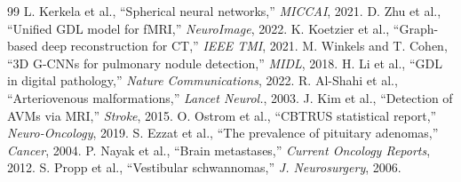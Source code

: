 \documentclass[10pt,twocolumn,letterpaper]{article}
\begin{document}
\begin{thebibliography}{99}
 L. Kerkela et al., ``Spherical neural networks,'' \textit{MICCAI}, 2021.
 D. Zhu et al., ``Unified GDL model for fMRI,'' \textit{NeuroImage}, 2022.
 K. Koetzier et al., ``Graph-based deep reconstruction for CT,'' \textit{IEEE TMI}, 2021.
 M. Winkels and T. Cohen, ``3D G-CNNs for pulmonary nodule detection,'' \textit{MIDL}, 2018.
 H. Li et al., ``GDL in digital pathology,'' \textit{Nature Communications}, 2022.
 R. Al-Shahi et al., ``Arteriovenous malformations,'' \textit{Lancet Neurol.}, 2003.
 J. Kim et al., ``Detection of AVMs via MRI,'' \textit{Stroke}, 2015.
 O. Ostrom et al., ``CBTRUS statistical report,'' \textit{Neuro-Oncology}, 2019.
 S. Ezzat et al., ``The prevalence of pituitary adenomas,'' \textit{Cancer}, 2004.
 P. Nayak et al., ``Brain metastases,'' \textit{Current Oncology Reports}, 2012.
 S. Propp et al., ``Vestibular schwannomas,'' \textit{J. Neurosurgery}, 2006.
\end{thebibliography}
\end{document}
